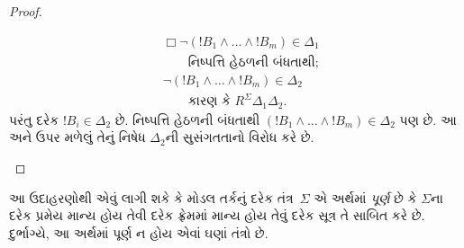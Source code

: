 \begin{proof}
\begin{enumerate}
\begin{align*}
      & \Box\lnot (!B_1 \land \dots \land !B_m) \in \Delta_1\\
      &\qquad\text{નિષ્પત્તિ હેઠળની બંધતાથી}; \\
      & \lnot (!B_1 \land \dots \land !B_m) \in \Delta_2\\
      &\qquad \text{કારણ કે }
      R^\Sigma \Delta_1\Delta_2.
    \end{align*}
    પરંતુ દરેક $!B_i \in \Delta_2$ છે. નિષ્પત્તિ હેઠળની બંધતાથી
    $(!B_1 \land \dots \land !B_m) \in \Delta_2$ પણ છે.
    આ અને ઉપર મળેલું તેનું નિષેધ $\Delta_2$ની સુસંગતતાનો
    વિરોધ કરે છે.
  \end{enumerate}
\end{proof}



આ ઉદાહરણોથી એવું લાગી શકે કે મોડલ તર્કનું દરેક તંત્ર~$\Sigma$
એ અર્થમાં \emph{પૂર્ણ} છે કે $\Sigma$ના દરેક પ્રમેય માન્ય હોય તેવી
દરેક ફ્રેમમાં માન્ય હોય તેવું દરેક સૂત્ર તે સાબિત કરે છે.
દુર્ભાગ્યે, આ અર્થમાં પૂર્ણ ન હોય એવાં ઘણાં તંત્રો છે.
\endgroup


\OLEndChapterHook
\endgroup


\begingroup
\makeatletter{}\makeatother

\label{guunit:OLP-0450}


\begingroup
\makeatletter{}\makeatother


\label{guunit:OLP-0451}


